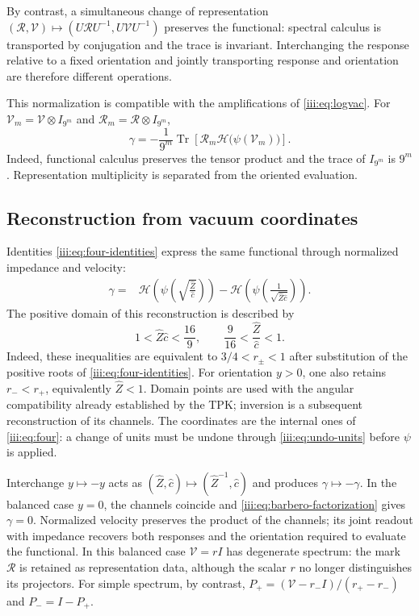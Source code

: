 By contrast, a simultaneous change of representation
$(\mathcal R,\mathcal V)\mapsto
(U\mathcal RU^{-1},U\mathcal VU^{-1})$ preserves the functional:
spectral calculus is transported by conjugation and the trace is
invariant. Interchanging the response relative to a fixed orientation
and jointly transporting response and orientation are therefore
different operations.

This normalization is compatible with the amplifications of
\eqref{iii:eq:logvac}. For
$\mathcal V_m=\mathcal V\otimes I_{9^m}$ and
$\mathcal R_m=\mathcal R\otimes I_{9^m}$,
\begin{equation}
 \gamma=-\frac1{9^m}\operatorname{Tr}
 \left[\mathcal R_m\mathcal H\bigl(\psi(\mathcal V_m)\bigr)\right].
 \label{iii:eq:barbero-amplification}
\end{equation}
Indeed, functional calculus preserves the tensor product and the trace
of $I_{9^m}$ is $9^m$. Representation multiplicity is separated
from the oriented evaluation.

\subsection{Reconstruction from vacuum coordinates}

Identities \eqref{iii:eq:four-identities} express the same
functional through normalized impedance and velocity:
\begin{align}
 \gamma={}&
 \mathcal H\!\left(\psi\!\left(
     \sqrt{\frac{\widehat Z}{\widehat c}}\right)\right)
 -\mathcal H\!\left(\psi\!\left(
     \frac1{\sqrt{\widehat Z\widehat c}}\right)\right).
 \label{iii:eq:barbero-zc}
\end{align}
The positive domain of this reconstruction is described by
\begin{equation}
 1<\widehat Z\widehat c<\frac{16}{9},\qquad
 \frac9{16}<\frac{\widehat Z}{\widehat c}<1.
 \label{iii:eq:barbero-zc-domain}
\end{equation}
Indeed, these inequalities are equivalent to
$3/4<r_\pm<1$ after substitution of the positive roots of
\eqref{iii:eq:four-identities}. For orientation $y>0$, one also retains
$r_-<r_+$, equivalently $\widehat Z<1$. Domain points
are used with the angular compatibility already established by
the TPK; inversion is a subsequent reconstruction of its channels.
The coordinates are the internal ones of \eqref{iii:eq:four}: a change of
units must be undone through \eqref{iii:eq:undo-units} before
$\psi$ is applied.

Interchange $y\mapsto-y$ acts as
$(\widehat Z,\widehat c)\mapsto(\widehat Z^{-1},\widehat c)$ and
produces $\gamma\mapsto-\gamma$. In the balanced case $y=0$,
the channels coincide and \eqref{iii:eq:barbero-factorization} gives
$\gamma=0$. Normalized velocity preserves the product of the
channels; its joint readout with impedance recovers both
responses and the orientation required to evaluate the functional.
In this balanced case $\mathcal V=rI$ has degenerate spectrum:
the mark $\mathcal R$ is retained as representation data, although
the scalar $r$ no longer distinguishes its projectors. For simple spectrum,
by contrast,
$P_+=(\mathcal V-r_-I)/(r_+-r_-)$ and $P_-=I-P_+$.


